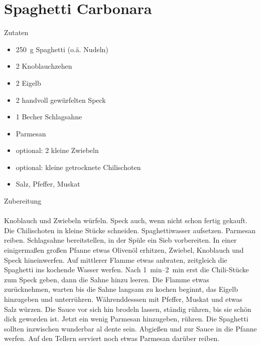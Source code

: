 \section*{Spaghetti Carbonara}
\ihead{}\ohead{}
\cfoot{}
{\Large Zutaten}
\begin{multicols}{2}
\begin{itemize}
    \item \SI{250}{g} Spaghetti (o.ä. Nudeln)
    \item \num{2} Knoblauchzehen
    \item \num{2} Eigelb
    \item \num{2} handvoll gewürfelten Speck
    \item \num{1} Becher Schlagsahne
    \item Parmesan
    \item optional: \num{2} kleine Zwiebeln
    \item optional: kleine getrocknete Chilischoten
    \item Salz, Pfeffer, Muskat
\end{itemize}
\end{multicols}
\noindent
{\Large Zubereitung}\\
\\
Knoblauch und Zwiebeln würfeln.
Speck auch, wenn nicht schon fertig gekauft.
Die Chilischoten in kleine Stücke schneiden.
Spaghettiwasser aufsetzen.
Parmesan reiben.
Schlagsahne bereitstellen, in der Spüle ein Sieb vorbereiten.
In einer einigermaßen großen Pfanne etwas Olivenöl erhitzen, Zwiebel, Knoblauch und Speck hineinwerfen.
Auf mittlerer Flamme etwas anbraten, zeitgleich die Spaghetti ins kochende Wasser werfen.
Nach \SIrange{1}{2}{min} erst die Chili-Stücke zum Speck geben, dann die Sahne hinzu leeren.
Die Flamme etwas zurücknehmen, warten bis die Sahne langsam zu kochen beginnt, das Eigelb hinzugeben und unterrühren.
Währenddesssen mit Pfeffer, Muskat und etwas Salz würzen.
Die Sauce vor sich hin brodeln lassen, ständig rühren, bis sie schön dick geworden ist.
Jetzt ein wenig Parmesan hinzugeben, rühren.
Die Spaghetti sollten inzwischen wunderbar al dente sein.
Abgießen und zur Sauce in die Pfanne werfen.
Auf den Tellern serviert noch etwas Parmesan darüber reiben.